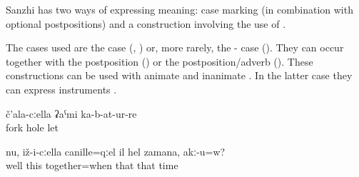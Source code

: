 Sanzhi has two ways of expressing  meaning: case marking (in combination with optional postpositions) and a construction involving the use of .

The cases used are the  case (, ) or, more rarely, the - case (). They can occur together with the postposition  () or the postposition\slash adverb  (). These constructions can be used with animate and inanimate . In the latter case they can express instruments .
%
\begin{exe}
	\ex	\label{ex:having made a hole with a fork}
	\gll	č'ala-cːella	ʡaˁmi	ka-b-at-ur-re\\
		fork	hole	let\\
	\glt	{}

	\ex	\label{ex:Well, he was together with him at that time, right}
	\gll	nu,	iž-i-cːella	canille=qːel	il	hel	zamana,	akː-u=w?\\
		well	this	together=when	that	that	time	\\
	\glt	{}
\end{exe}

